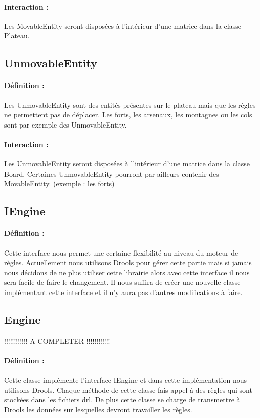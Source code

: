 			\paragraph{Interaction :}
			Les MovableEntity seront disposées à l'intérieur d'une matrice dans la classe Plateau.

		\subsection*{UnmovableEntity}

			\paragraph{Définition :}
			Les UnmovableEntity sont des entités présentes sur le plateau mais que les règles ne permettent pas de déplacer. 
			Les forts, les arsenaux, les montagnes ou les cols sont par exemple des UnmovableEntity.
			\paragraph{Interaction :}
			Les UnmovableEntity seront disposées à l'intérieur d'une matrice dans la classe Board. 
			Certaines UnmovableEntity pourront par ailleurs contenir des MovableEntity. (exemple : les forts)

		
		\subsection*{IEngine}

			\paragraph{Définition :}
			Cette interface nous permet une certaine flexibilité au niveau du moteur de règles. Actuellement nous utilisons Drools pour gérer cette partie mais si jamais nous décidons de ne plus utiliser cette librairie alors avec cette interface il nous sera facile de faire le changement.
			Il nous suffira de créer une nouvelle classe implémentant cette interface et il n'y aura pas d'autres modifications à faire.


		\subsection*{Engine}

			!!!!!!!!!!!! A COMPLETER !!!!!!!!!!!!
			\paragraph{Définition :}
			Cette classe implémente l'interface IEngine et dans cette implémentation nous utilisons Drools. Chaque méthode de cette classe fais appel à des règles qui sont stockées dans les fichiers drl. 
			De plus cette classe se charge de transmettre à Drools les données sur lesquelles devront travailler les règles.
